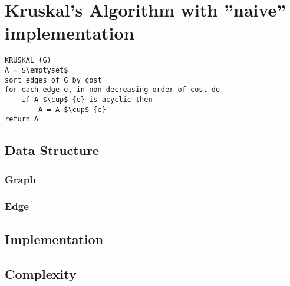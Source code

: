 \section{Kruskal's Algorithm with ''naive'' implementation}\label{kruskal_naive}

\begin{lstlisting}[mathescape=true]
KRUSKAL (G)
A = $\emptyset$
sort edges of G by cost
for each edge e, in non decreasing order of cost do
	if A $\cup$ {e} is acyclic then
		A = A $\cup$ {e}
return A	
\end{lstlisting}


\subsection{Data Structure}
	\subsubsection{Graph} 

	\subsubsection{Edge}


\subsection{Implementation}


\subsection{Complexity}
	

\pagebreak